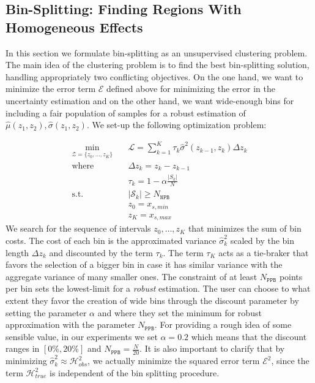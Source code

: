 \documentclass[twoside]{article}
\begin{document}
\subsection{Bin-Splitting: Finding Regions With Homogeneous Effects}
\label{sec:bin-spliting}

In this section we formulate bin-splitting as an unsupervised
clustering problem. The main idea of the clustering problem is to find
the best bin-splitting solution, handling appropriately two
conflicting objectives. On the one hand, we want to minimize the error
term \(\mathcal{E}\) defined above for minimizing the error in the
uncertainty estimation and on the other hand, we want wide-enough bins
for including a fair population of samples for a robust estimation of
\(\hat{\mu}(z_1, z_2), \hat{\sigma}(z_1, z_2)\). We set-up the
following optimization problem:

\begin{equation}
  \label{eq:opt}
\begin{aligned}
  \min_{ \mathcal{Z} = \{z_0, \ldots, z_K\}} \quad & \mathcal{L} = \sum_{k=1}^K \tau_k \hat{\sigma}^2(z_{k-1}, z_k) \Delta z_k \\
  \textrm{where} \quad & \Delta z_k = z_k - z_{k-1} \\
  & \tau_k = 1 - \alpha \frac{|S_k|}{N} \\
  \textrm{s.t.} \quad & |\mathcal{S}_k| \geq N_{\mathtt{NPB}}\\
                                     & z_0 = x_{s,min}\\
                                     & z_K = x_{s, max}
\end{aligned}
\end{equation}
%
We search for the sequence of intervals \(z_0, \ldots, z_K\) that
minimizes the sum of bin costs. The cost of each bin is the
approximated variance \(\hat{\sigma}^2_k\) scaled by the bin length
\(\Delta z_k\) and discounted by the term \(\tau_k\). The term
\(\tau_K\) acts as a tie-braker that favors the selection of a bigger
bin in case it has similar variance with the aggregate variance of
many smaller ones. The constraint of at least \(N_{\mathtt{PPB}}\)
points per bin sets the lowest-limit for a \textit{robust}
estimation. The user can choose to what extent they favor the creation
of wide bins through the discount parameter by setting the parameter
\(\alpha\) and where they set the minimum for robust approximation
with the parameter \(N_{\mathtt{PPB}}\). For providing a rough idea of
some sensible value, in our experiments we set \(\alpha = 0.2\) which
means that the discount ranges in \([0\%, 20\%]\) and
\(N_{\mathtt{PPB}} = \frac{N}{20}\). It is also important to clarify
that by minimizing \(\hat{\sigma}^2_k \approx \mathcal{H}_{obs}^2\),
we actually minimize the squared error term \(\mathcal{E}^2\), since
the term \(\mathcal{H}^2_{true}\) is independent of the bin splitting
procedure.
\end{document}
